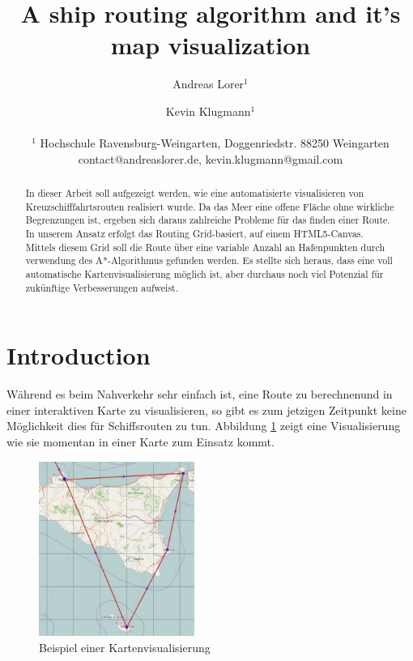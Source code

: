 \documentclass[letterpaper]{article}
\title{A ship routing algorithm and it's map visualization}
\author{Andreas Lorer$^{1}$ \and  Kevin Klugmann$^{1}$\\
\mbox{}\\
$^{1}$ Hochschule Ravensburg-Weingarten, Doggenriedstr. 88250 Weingarten \\
contact@andreaslorer.de, kevin.klugmann@gmail.com}
\begin{document}
\maketitle

\begin{abstract}
	In dieser Arbeit soll aufgezeigt werden, wie eine automatisierte visualisieren von Kreuzschifffahrtsrouten realisiert wurde. Da das Meer eine offene Fläche ohne wirkliche Begrenzungen ist, ergeben sich daraus zahlreiche Probleme für das finden einer Route. In unserem Ansatz erfolgt das Routing Grid-basiert, auf einem HTML5-Canvas. Mittels diesem Grid soll die Route über eine variable Anzahl an Hafenpunkten durch verwendung des A*-Algorithmus gefunden werden. Es stellte sich heraus, dass eine voll automatische Kartenvisualisierung möglich ist, aber durchaus noch viel Potenzial für zukünftige Verbesserungen aufweist.
\end{abstract}

\section{Introduction}
	Während es beim Nahverkehr sehr einfach ist, eine Route zu berechnen\footnotemark und in einer interaktiven Karte zu visualisieren, so gibt es zum jetzigen Zeitpunkt keine Möglichkeit dies für Schiffsrouten zu tun. Abbildung \ref{fig:visualisierungsproblem} zeigt eine Visualisierung wie sie momentan in einer Karte zum Einsatz kommt. 


	\begin{figure}[!htb]
		\begin{center}
		\includegraphics[width=2in]{visualisierungsproblem}
		\caption{Beispiel einer Kartenvisualisierung}
		\label{fig:visualisierungsproblem}
		\end{center}
	\end{figure}
\end{document}
